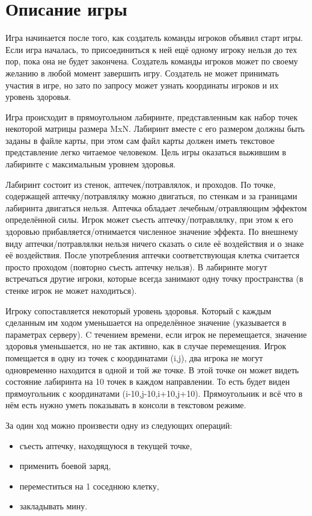 \documentclass[russian,a4paper]{article}
\begin{document}
\section{Описание игры}

Игра начинается после того, как создатель команды игроков объявил старт игры. 
Если игра началась, то присоединиться к ней ещё одному игроку нельзя до тех пор,
пока она не будет закончена. Создатель команды игроков может по своему желанию 
в любой момент завершить игру. Создатель не может принимать участия в игре, 
но зато по запросу может узнать координаты игроков и их уровень здоровья.

Игра происходит в прямоугольном лабиринте, представленным как набор
точек некоторой матрицы размера MxN. Лабиринт вместе с его размером
должны быть заданы в файле карты, при этом сам файл карты должен иметь
текстовое представление легко читаемое человеком. Цель игры оказаться
выжившим в лабиринте с максимальным уровнем здоровья.

Лабиринт состоит из стенок, аптечек/потравлялок, и проходов. По точке,
содержащей аптечку/потравлялку можно двигаться, по стенкам и за
границами лабиринта двигаться нельзя. Аптечка обладает
лечебным/отравляющим эффектом определённой силы. Игрок может съесть
аптечку/потравлялку, при этом к его здоровью прибавляется/отнимается
численное значение эффекта. По внешнему виду аптечки/потравлялки нельзя
ничего сказать о силе её воздействия и о знаке её воздействия. После
употребления аптечки соответствующая клетка считается просто проходом
(повторно съесть аптечку нельзя). В лабиринте могут встречаться другие
игроки, которые всегда занимают одну точку пространства (в стенке игрок
не может находиться).

Игроку сопоставляется некоторый уровень здоровья. Который с каждым
сделанным им ходом уменьшается на определённое значение (указывается в
параметрах серверу). C течением времени, если игрок не перемещается,
значение здоровья уменьшается, но не так активно, как в случае
перемещения. Игрок помещается в одну
из точек с координатами (i,j), два игрока не могут одновременно
находится в одной и той же точке. В этой точке он может видеть
состояние лабиринта на 10 точек в каждом направлении. То есть будет
виден прямоугольник с координатами (i-10,j-10,i+10,j+10). Прямоугольник
и всё что в нём есть нужно уметь показывать в консоли в текстовом
режиме.

За один ход можно произвести одну из следующих операций:
\begin{itemize}
\item съесть аптечку, находящуюся в текущей точке,
\item применить боевой заряд,
\item переместиться на 1 соседнюю клетку,
\item закладывать мину.
\end{itemize}
\end{document}
